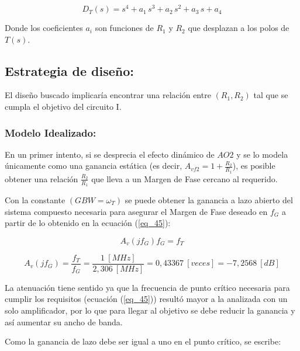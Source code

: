 \documentclass[12pt,a4paper]{article}
\begin{document}
   \begin{equation}
        \label{eq_51}
D_T(s) = s^4 + a_1\,s^3 + a_2\,s^2 + a_3\,s + a_4
\end{equation}
    \hspace{0.5 cm}

Donde los coeficientes $a_i$ son funciones de $R_1$ y $R_2$ que desplazan a los polos de $T(s)$.
\\

\subsection{Estrategia de diseño:}

El diseño buscado implicaría encontrar una relación entre $(R_1,R_2)$ tal que se cumpla el objetivo del circuito I.
\\

\subsubsection{Modelo Idealizado:}

En un primer intento, si se desprecia el efecto dinámico de $AO2$ y se lo modela únicamente como una ganancia estática (es decir, $A_{vf2}=1+\frac{R_2}{R_1}$), es posible obtener una relación $\tfrac{R_2}{R_1}$ que lleva a un Margen de Fase cercano al requerido.

Con la constante $(GBW=\omega_T)$ se puede obtener la ganancia a lazo abierto del sistema compuesto necesaria para asegurar el Margen de Fase deseado en $f_G$ a partir de lo obtenido en la ecuación (\ref{eq_45}):

   \begin{equation}
        \label{eq_52}
A_v(jf_G)f_G = f_T
\end{equation}

   \begin{equation}
        \label{eq_53}
A_v(jf_G) = \frac{f_T}{f_G} = \frac{1~[MHz]}{2,306~[MHz]} = 0,43367~[veces]= -7,2568~[dB]
\end{equation}
    \hspace{0.5 cm}

La atenuación tiene sentido ya que la frecuencia de punto crítico necesaria para cumplir los requisitos (ecuación (\ref{eq_45})) resultó mayor a la analizada con un solo amplificador, por lo que para llegar al objetivo se debe reducir la ganancia y así aumentar su ancho de banda.

Como la ganancia de lazo debe ser igual a uno en el punto crítico, se escribe:
\end{document}
